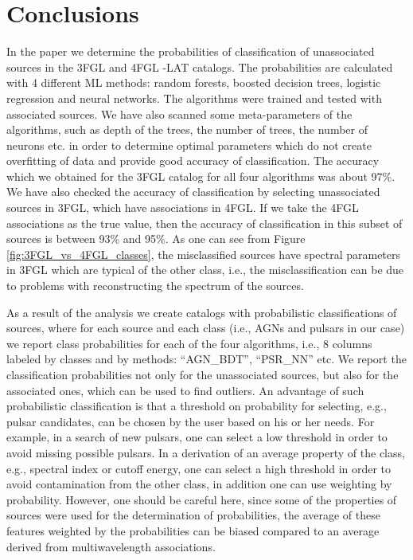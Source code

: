 \section{Conclusions}

In the paper we determine the probabilities of classification of unassociated sources in the 3FGL and 4FGL \Fermi-LAT catalogs.
The probabilities are calculated with 4 different ML methods: random forests, boosted decision trees, logistic regression and neural networks.
The algorithms were trained and tested with associated sources.
We have also scanned some meta-parameters of the algorithms, such as depth of the trees, the number of trees, the number of neurons etc. in order to determine optimal parameters which do not create overfitting of data and provide good accuracy of classification.
The accuracy which we obtained for the 3FGL catalog for all four algorithms was about 97\%.
We have also checked the accuracy of classification by selecting unassociated sources in 3FGL, which have associations in 4FGL.
If we take the 4FGL associations as the true value, then the accuracy of classification in this subset of sources is between 93\% and 95\%.
As one can see from Figure \ref{fig:3FGL_vs_4FGL_classes}, the misclassified sources have spectral parameters in 3FGL which are typical of the other class, i.e., the misclassification can be due to problems with reconstructing the spectrum of the sources.

As a result of the analysis we create catalogs with probabilistic classifications of sources, where for each source and each class (i.e., AGNs and pulsars in our case) we report class probabilities for each of the four algorithms, i.e., 8 columns labeled by classes and by methods: ``AGN\_BDT'', ``PSR\_NN'' etc.
We report the classification probabilities not only for the unassociated sources, but also for the associated ones, which can be used to find outliers.
An advantage of such probabilistic classification is that a threshold on probability for selecting, e.g., pulsar candidates, can be chosen by the user based on his or her needs.
For example, in a search of new pulsars, one can select a low threshold in order to avoid missing possible pulsars.
In a derivation of an average property of the class, e.g., spectral index or cutoff energy, one can select a high threshold in order to avoid contamination from the other class, in addition one can use weighting by probability.
However, one should be careful here, since some of the properties of sources were used for the determination of probabilities,
the average of these features weighted by the probabilities can be biased compared to an average derived from multiwavelength associations.

